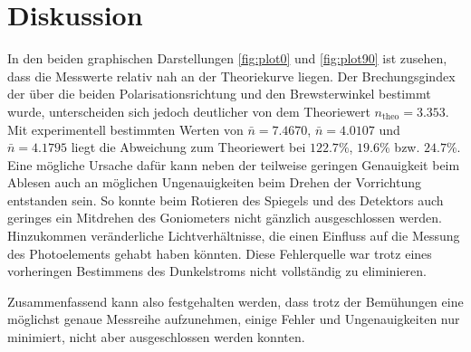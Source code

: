 \section{Diskussion}
\label{sec:Diskussion}

In den beiden graphischen Darstellungen \autoref{fig:plot0} und \autoref{fig:plot90} ist zusehen, dass die Messwerte relativ nah an der Theoriekurve liegen. 
Der Brechungsgindex der über die beiden Polarisationsrichtung und den Brewsterwinkel bestimmt wurde, unterscheiden sich jedoch deutlicher von dem Theoriewert $n_{\text{theo}}=3.353$. Mit
experimentell bestimmten Werten von $\bar{n}=7.4670$, $\bar{n}= 4.0107$ und $\bar{n}= 4.1795$ liegt die Abweichung zum Theoriewert bei $122.7\%$,  $19.6\%$ bzw. $24.7\%$. Eine mögliche Ursache dafür kann neben der teilweise geringen
Genauigkeit beim Ablesen auch an möglichen Ungenauigkeiten beim Drehen der Vorrichtung entstanden sein. So konnte beim Rotieren des Spiegels und des Detektors auch geringes ein Mitdrehen des Goniometers nicht gänzlich ausgeschlossen werden.
Hinzukommen veränderliche Lichtverhältnisse, die einen Einfluss auf die Messung des Photoelements gehabt haben könnten. Diese Fehlerquelle war trotz eines vorheringen Bestimmens des Dunkelstroms nicht vollständig zu eliminieren.

Zusammenfassend kann also festgehalten werden, dass trotz der Bemühungen eine möglichst genaue Messreihe aufzunehmen, einige Fehler und Ungenauigkeiten nur minimiert, nicht aber ausgeschlossen werden konnten.